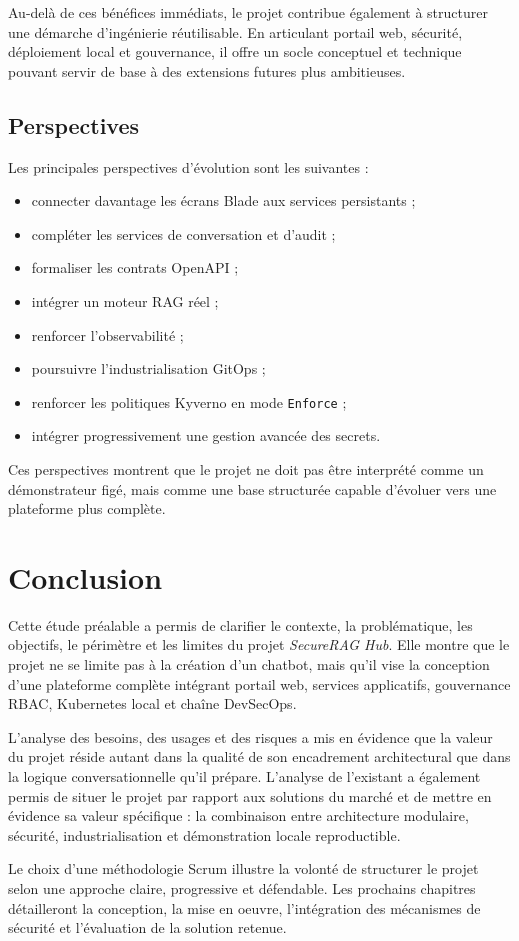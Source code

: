 Au-delà de ces bénéfices immédiats, le projet contribue également à structurer une démarche d’ingénierie réutilisable. En articulant portail web, sécurité, déploiement local et gouvernance, il offre un socle conceptuel et technique pouvant servir de base à des extensions futures plus ambitieuses.

\subsection{Perspectives}

Les principales perspectives d’évolution sont les suivantes :

\begin{itemize}
    \item connecter davantage les écrans Blade aux services persistants ;
    \item compléter les services de conversation et d’audit ;
    \item formaliser les contrats OpenAPI ;
    \item intégrer un moteur RAG réel ;
    \item renforcer l’observabilité ;
    \item poursuivre l’industrialisation GitOps ;
    \item renforcer les politiques Kyverno en mode \texttt{Enforce} ;
    \item intégrer progressivement une gestion avancée des secrets.
\end{itemize}

Ces perspectives montrent que le projet ne doit pas être interprété comme un démonstrateur figé, mais comme une base structurée capable d’évoluer vers une plateforme plus complète.

\section{Conclusion}

Cette étude préalable a permis de clarifier le contexte, la problématique, les objectifs, le périmètre et les limites du projet \textit{SecureRAG Hub}. Elle montre que le projet ne se limite pas à la création d’un chatbot, mais qu’il vise la conception d’une plateforme complète intégrant portail web, services applicatifs, gouvernance RBAC, Kubernetes local et chaîne DevSecOps.

L’analyse des besoins, des usages et des risques a mis en évidence que la valeur du projet réside autant dans la qualité de son encadrement architectural que dans la logique conversationnelle qu’il prépare. L’analyse de l’existant a également permis de situer le projet par rapport aux solutions du marché et de mettre en évidence sa valeur spécifique : la combinaison entre architecture modulaire, sécurité, industrialisation et démonstration locale reproductible.

Le choix d’une méthodologie Scrum illustre la volonté de structurer le projet selon une approche claire, progressive et défendable. Les prochains chapitres détailleront la conception, la mise en oeuvre, l’intégration des mécanismes de sécurité et l’évaluation de la solution retenue.

